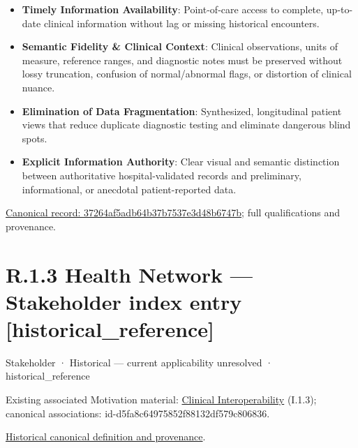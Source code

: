 \begin{itemize}


\item \textbf{Timely Information Availability}: Point-of-care access to complete, up-to-date clinical information without lag or missing historical encounters.

\item \textbf{Semantic Fidelity \& Clinical Context}: Clinical observations, units of measure, reference ranges, and diagnostic notes must be preserved without lossy truncation, confusion of normal/abnormal flags, or distortion of clinical nuance.

\item \textbf{Elimination of Data Fragmentation}: Synthesized, longitudinal patient views that reduce duplicate diagnostic testing and eliminate dangerous blind spots.

\item \textbf{Explicit Information Authority}: Clear visual and semantic distinction between authoritative hospital-validated records and preliminary, informational, or anecdotal patient-reported data.

\end{itemize}

{\footnotesize \href{../../../../continuum/motivation/stakeholder/37264af5adb64b37b7537e3d48b6747b.md}{Canonical record: 37264af5adb64b37b7537e3d48b6747b}; full qualifications and provenance.}\par
\section*{R.1.3 Health Network — Stakeholder index entry [historical\_reference]}
\label{navigation:R.1.3}

\label{element:55e57c01dfe146a2a225228b31196862}
{\small Stakeholder · Historical — current applicability unresolved · historical\_reference}\par
{\small Existing associated Motivation material: \hyperref[element:babb9f5d63d8435890c1db3579ec78d9]{Clinical Interoperability} (I.1.3); canonical associations: id-d5fa8c64975852f88132df579c806836.}\par
\href{../../../../continuum/motivation/stakeholder/55e57c01dfe146a2a225228b31196862.md}{Historical canonical definition and provenance}.\par
